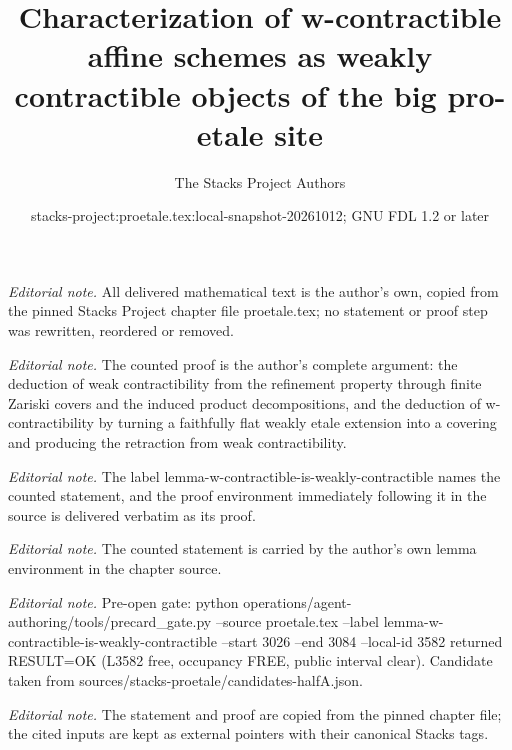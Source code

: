 \documentclass[10pt,a4paper]{amsart}
\title{Characterization of w-contractible affine schemes as weakly contractible objects of the big pro-etale site}
\author{The Stacks Project Authors}
\date{stacks-project:proetale.tex:local-snapshot-20261012; GNU FDL 1.2 or later}
\theoremstyle{plain}
\theoremstyle{definition}
\theoremstyle{remark}
\numberwithin{equation}{subsection}
\begin{document}
\maketitle
\noindent\textit{Editorial note.} All delivered mathematical text is the author's own, copied from the pinned Stacks Project chapter file proetale.tex; no statement or proof step was rewritten, reordered or removed.\par\medskip
\noindent\textit{Editorial note.} The counted proof is the author's complete argument: the deduction of weak contractibility from the refinement property through finite Zariski covers and the induced product decompositions, and the deduction of w-contractibility by turning a faithfully flat weakly etale extension into a covering and producing the retraction from weak contractibility.\par\medskip
\noindent\textit{Editorial note.} The label lemma-w-contractible-is-weakly-contractible names the counted statement, and the proof environment immediately following it in the source is delivered verbatim as its proof.\par\medskip
\noindent\textit{Editorial note.} The counted statement is carried by the author's own lemma environment in the chapter source.\par\medskip
\noindent\textit{Editorial note.} Pre-open gate: python operations/agent-authoring/tools/precard\_gate.py --source proetale.tex --label lemma-w-contractible-is-weakly-contractible --start 3026 --end 3084 --local-id 3582 returned RESULT=OK (L3582 free, occupancy FREE, public interval clear). Candidate taken from sources/stacks-proetale/candidates-halfA.json.\par\medskip
\noindent\textit{Editorial note.} The statement and proof are copied from the pinned chapter file; the cited inputs are kept as external pointers with their canonical Stacks tags.\par\medskip
\end{document}
